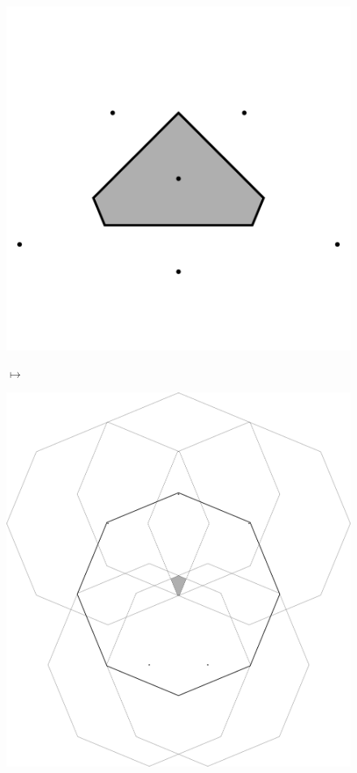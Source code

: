 \documentclass[text.tex]{subfiles}
\begin{document}
\begin{figure}[h!]
\centering
\begin{minipage}{0.25\textwidth}
\includegraphics[width=\textwidth]{img/2D/intersectionTile03}
\end{minipage}
\qquad$\longmapsto$\qquad
\begin{minipage}{0.4\textwidth}
\includegraphics[width=\textwidth]{img/2D/intersection03}

\end{minipage}
\end{figure}
\end{document}
